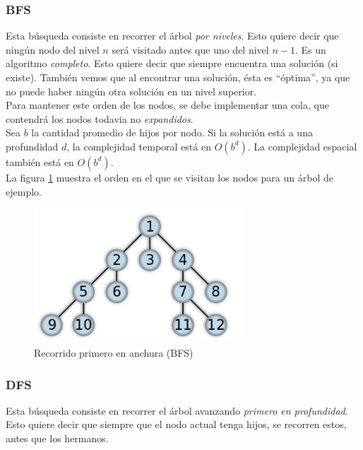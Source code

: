 \documentclass[11pt,a4paper]{article}
\begin{document}
\subsubsection{BFS}
Esta búsqueda consiste en recorrer el árbol \emph{por niveles}. Esto quiere decir que ningún nodo del nivel $n$ será visitado antes que uno del nivel $n-1$.
Es un algoritmo \emph{completo}. Esto quiere decir que siempre encuentra una solución (si existe). También vemos que al encontrar una solución, ésta es ``óptima'', ya que no puede haber ningún otra solución en un nivel superior. \\

Para mantener este orden de los nodos, se debe implementar una cola, que contendrá los nodos todavia no \emph{expandidos}. \\

Sea $b$ la cantidad promedio de hijos por nodo. Si la solución está a una profundidad $d$, la complejidad temporal está en $O(b^d)$. La complejidad espacial también está en $O(b^d)$. \\  %

La figura \ref{fig:BFS} muestra el orden en el que se visitan los nodos para un árbol de ejemplo. \\

{
\begin{figure}[H]
  \centering
    \includegraphics[width=0.7\textwidth]{img/BFS}
  \caption{Recorrido primero en anchura (BFS)}
  \label{fig:BFS}
\end{figure}
}
\subsubsection{DFS}
Esta búsqueda consiste en recorrer el árbol avanzando \emph{primero en profundidad}. Esto quiere decir que siempre que el nodo actual tenga hijos, se recorren estos, antes que los hermanos. \\
\end{document}
